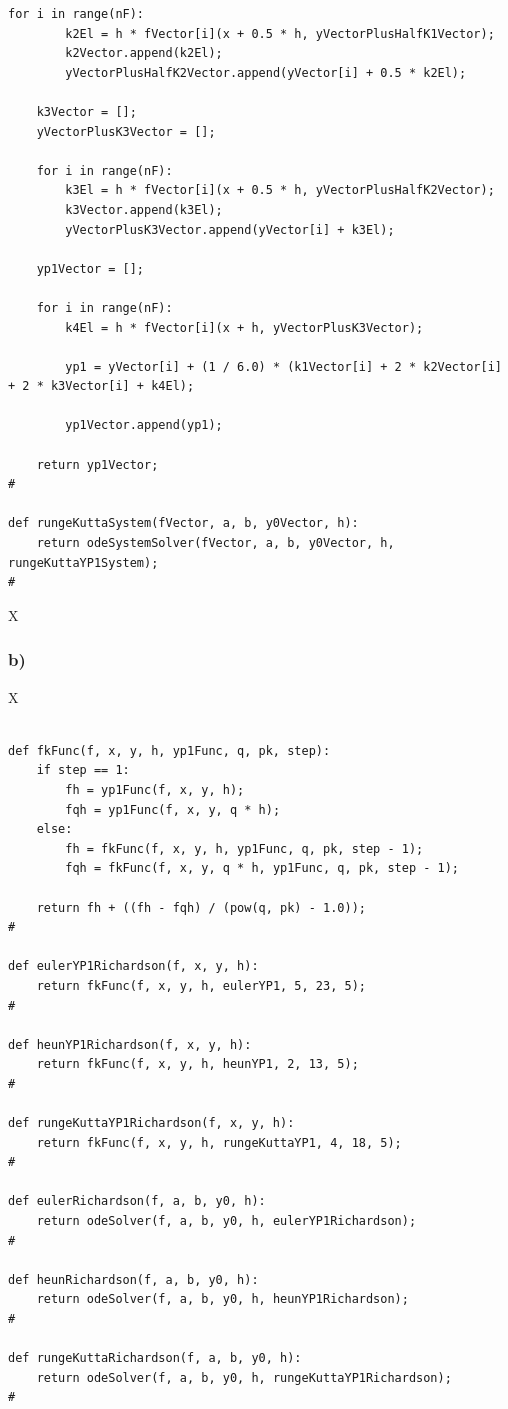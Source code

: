 \begin{lstlisting}[caption=todo]
	for i in range(nF):
		k2El = h * fVector[i](x + 0.5 * h, yVectorPlusHalfK1Vector);
		k2Vector.append(k2El);
		yVectorPlusHalfK2Vector.append(yVector[i] + 0.5 * k2El);
	
	k3Vector = [];
	yVectorPlusK3Vector = [];
	
	for i in range(nF):
		k3El = h * fVector[i](x + 0.5 * h, yVectorPlusHalfK2Vector);
		k3Vector.append(k3El);
		yVectorPlusK3Vector.append(yVector[i] + k3El);
	
	yp1Vector = [];
	
	for i in range(nF):
		k4El = h * fVector[i](x + h, yVectorPlusK3Vector);
		
		yp1 = yVector[i] + (1 / 6.0) * (k1Vector[i] + 2 * k2Vector[i] + 2 * k3Vector[i] + k4El);
		
		yp1Vector.append(yp1);
	
	return yp1Vector;
#

def rungeKuttaSystem(fVector, a, b, y0Vector, h):
	return odeSystemSolver(fVector, a, b, y0Vector, h, rungeKuttaYP1System);
#

\end{lstlisting}



X



\subsubsection{b)}

X

\begin{lstlisting}[caption=todo]

def fkFunc(f, x, y, h, yp1Func, q, pk, step):
	if step == 1:
		fh = yp1Func(f, x, y, h);
		fqh = yp1Func(f, x, y, q * h);
	else:
		fh = fkFunc(f, x, y, h, yp1Func, q, pk, step - 1);
		fqh = fkFunc(f, x, y, q * h, yp1Func, q, pk, step - 1);
	
	return fh + ((fh - fqh) / (pow(q, pk) - 1.0));
#

def eulerYP1Richardson(f, x, y, h):
	return fkFunc(f, x, y, h, eulerYP1, 5, 23, 5);
#

def heunYP1Richardson(f, x, y, h):
	return fkFunc(f, x, y, h, heunYP1, 2, 13, 5);
#

def rungeKuttaYP1Richardson(f, x, y, h):
	return fkFunc(f, x, y, h, rungeKuttaYP1, 4, 18, 5);
#

def eulerRichardson(f, a, b, y0, h):
	return odeSolver(f, a, b, y0, h, eulerYP1Richardson);
#

def heunRichardson(f, a, b, y0, h):
	return odeSolver(f, a, b, y0, h, heunYP1Richardson);
#

def rungeKuttaRichardson(f, a, b, y0, h):
	return odeSolver(f, a, b, y0, h, rungeKuttaYP1Richardson);
#


\end{lstlisting}



